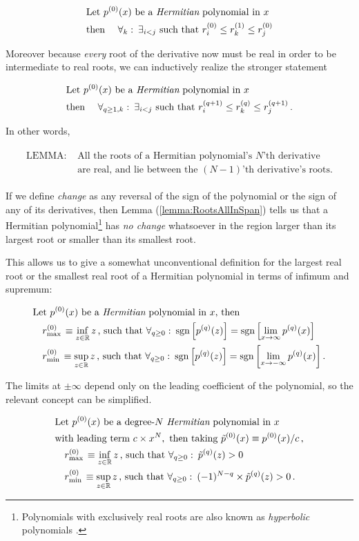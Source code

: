 \documentclass[
  12pt          %
  ,letterpaper  %
  ,center       %
  ,noupper      %
  ,english,fleqn]{uconnthesis}
\newcommand{\LeftEqns}[1]{\begin{fleqn}[\leftmargini minus \leftmargini]\begin{align}#1\end{align}\end{fleqn}}
\newcommand{\LeftEqn}[1]{\LeftEqns{\begin{split}#1\end{split}}}
\newcommand{\noeq}[1]{(\ref{#1})}
\begin{document}
\LeftEqn{
&\text{Let } p^{(0)}(x) \text{ be a {\em Hermitian} polynomial in $x$}
\\&\text{then }\quad \forall_{k} :\: \exists_{i<j}\text{ such that }r^{(0)}_i \leq r^{(1)}_k \leq r^{(0)}_j
}
Moreover because {\em every} root of the derivative now must be real in order to be intermediate to real roots, we can inductively realize the stronger statement
\LeftEqn{
&\text{Let } p^{(0)}(x) \text{ be a {\em Hermitian} polynomial in $x$}
\\&\text{then }\quad \forall_{q\geq 1,k} :\: \exists_{i<j}\text{ such that }r^{(q+1)}_i \leq r^{(q)}_k \leq r^{(q+1)}_j\,.
}
In other words,
\LeftEqn{\label{lemma:RootsAllInSpan}
\text{LEMMA:  }&\text{All the roots of a Hermitian polynomial's $N$'th derivative}
\\&\text{are real, and lie between the $(N-1)$'th derivative's roots.}
}
If we define {\em change} as any reversal of the sign of the polynomial or the sign of any of its derivatives, then Lemma \noeq{lemma:RootsAllInSpan} tells us that a Hermitian polynomial\footnote{Polynomials with exclusively real roots are also known as \emph{hyperbolic} polynomials \cite{Hyperbolic97,Hyperbolic01}.} has {\em no change} whatsoever in the region larger than its largest root or smaller than its smallest root. 

This allows us to give a somewhat unconventional definition for the largest real root or the smallest real root of a Hermitian polynomial in terms of infimum and supremum:
\LeftEqn{
&\text{Let } p^{(0)}(x) \text{ be a {\em Hermitian} polynomial in $x$, then}
\\&\quad r^{(0)}_{\max{}} \equiv \inf_{z\in \mathbb{R}}z\, { \text{, such that } \forall_{q\geq 0}:\: \operatorname{sgn}{\left[p^{(q)}(z)\right]} = \operatorname{sgn}{\left[\lim_{x\to \infty}{ p^{(q)}(x)}\right]}}
\\&\quad r^{(0)}_{\min{}} \equiv \sup_{z\in \mathbb{R}}z\, { \text{, such that } \forall_{q\geq 0}:\: \operatorname{sgn}{\left[p^{(q)}(z)\right]} = \operatorname{sgn}{\left[\lim_{x\to -\infty}{ p^{(q)}(x)}\right]}}\,.
}
The limits at $\pm \infty$ depend only on the leading coefficient of the polynomial, so the relevant concept can be simplified.
\LeftEqn{
&\text{Let } p^{(0)}(x) \text{ be a degree-$N$ {\em Hermitian} polynomial in $x$}
\\&\text{with leading term }c \times x^N,\text{ then taking }\tilde{p}^{(0)}(x)\equiv p^{(0)}(x)/c\,,
\\&\quad r^{(0)}_{\max{}} \equiv \inf_{z\in \mathbb{R}}z\, { \text{, such that } \forall_{q\geq 0}:\: \tilde{p}^{(q)}(z) > 0}
\\&\quad r^{(0)}_{\min{}} \equiv \sup_{z\in \mathbb{R}}z\, { \text{, such that } \forall_{q\geq 0}:\: (-1)^{N-q}\times \tilde{p}^{(q)}(z) > 0}\,.
}
\end{document}
